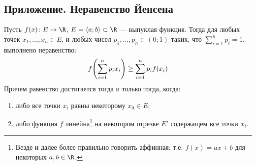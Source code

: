 \newpage
\subsection*{Приложение. Неравенство Йенсена}
\begin{theorem*}
    Пусть $f(x) \colon E \to \R$, $E = \langle a; b \rangle \subset \R$ --- выпуклая функция. Тогда для любых точек $x_1, \ldots, x_n \in E$, и любых чисел $p_1, \ldots, p_n \in (0; 1)$ таких, что $\sum_{i = 1}^{n} p_i = 1$, выполнено неравенство:
    \begin{equation}
        \label{eq:jensen-ineq}
        f\mleft(\sum_{i = 1}^{n}p_ix_i\mright) \geq \sum_{i = 1}^{n} p_i f(x_i)
    \end{equation}
    Причем равенство достигается тогда и только тогда, когда:
    \begin{enumerate}[noitemsep, topsep=0pt, parsep=0pt]
        \item либо все точки $x_i$ равны некоторому $x_0 \in E$;
        \item либо функция $f$ линейна\footnote{Везде и далее более правильно говорить аффинная: т.е. $f(x) = ax + b$ для некоторых $a, b \in \R$.} на некотором отрезке $E'$ содержащем все точки $x_i$.
    \end{enumerate}
\end{theorem*}

